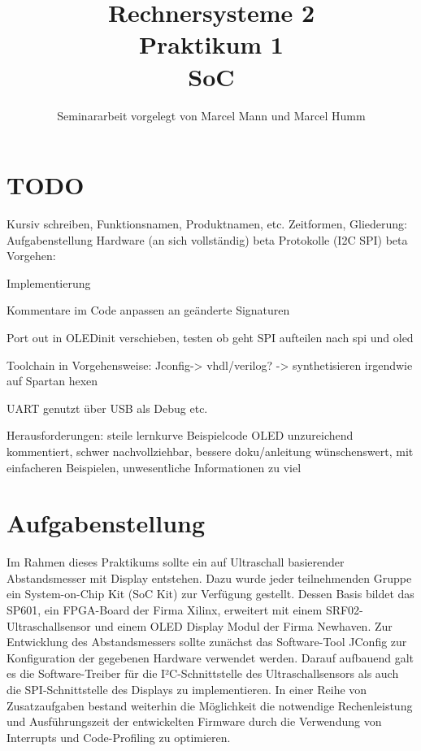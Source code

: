 \documentclass[parskip,
							 oneside,
							 11pt,
							 noheadingspace,
							 accentcolor=tud1d,
							 bigchapter,
							 colorback]{tudreport}
\title{\textbf{Rechnersysteme 2 \\ Praktikum 1 \\ SoC}}
\subtitle{Seminararbeit vorgelegt von Marcel Mann und Marcel Humm}
\begin{document}
\maketitle
\cleardoublepage

\pagestyle{empty}


\pagestyle{headings}

\chapter{TODO}
Kursiv schreiben, Funktionsnamen, Produktnamen, etc.
Zeitformen, 
Gliederung:
Aufgabenstellung
Hardware (an sich vollständig) beta
Protokolle (I2C SPI) beta
Vorgehen:

Implementierung
	
Kommentare im Code anpassen an geänderte Signaturen

Port out in OLEDinit verschieben, testen ob geht
SPI aufteilen nach spi und oled

Toolchain in Vorgehensweise: Jconfig-> vhdl/verilog? -> synthetisieren irgendwie auf Spartan hexen

UART genutzt über USB als Debug etc. 

Herausforderungen: steile lernkurve
Beispielcode OLED unzureichend kommentiert, schwer nachvollziehbar, bessere doku/anleitung wünschenswert, mit einfacheren Beispielen, unwesentliche Informationen zu viel 


\chapter{Aufgabenstellung}
Im Rahmen dieses Praktikums sollte ein auf Ultraschall basierender Abstandsmesser mit Display entstehen. Dazu wurde jeder teilnehmenden Gruppe ein System-on-Chip Kit (SoC Kit) zur Verfügung gestellt. Dessen Basis bildet das SP601, ein FPGA-Board der Firma Xilinx, erweitert mit einem SRF02-Ultraschallsensor und einem OLED Display Modul der Firma Newhaven.
Zur Entwicklung des Abstandsmessers sollte zunächst das Software-Tool JConfig zur Konfiguration der gegebenen Hardware verwendet werden. Darauf aufbauend galt es die Software-Treiber für die I²C-Schnittstelle des Ultraschallsensors als auch die SPI-Schnittstelle des Displays zu implementieren.
In einer Reihe von Zusatzaufgaben bestand weiterhin die Möglichkeit die notwendige Rechenleistung und Ausführungszeit der entwickelten Firmware durch die Verwendung von Interrupts und Code-Profiling zu optimieren.
\end{document}

